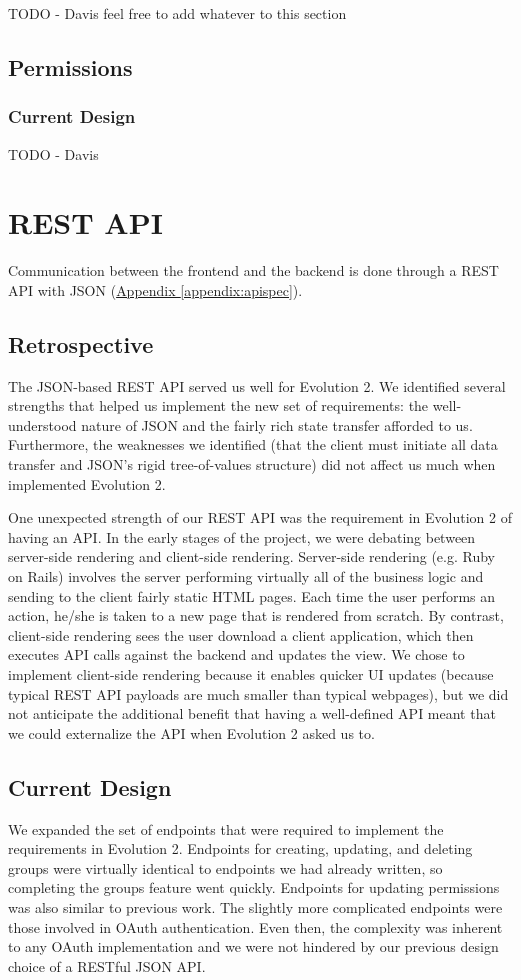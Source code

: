 \documentclass[12pt]{article}
\begin{document}
TODO - Davis feel free to add whatever to this section

\subsection{Permissions}
\subsubsection{Current Design}
TODO - Davis

\section{REST API}
\label{sec:REST}
Communication between the frontend and the backend is done through a REST API with JSON (\hyperref[appendix:apispec]{Appendix \ref{appendix:apispec}}).

\subsection{Retrospective}
The JSON-based REST API served us well for Evolution 2. We identified several strengths that helped us implement the new set of requirements: the well-understood nature of JSON and the fairly rich state transfer afforded to us. Furthermore, the weaknesses we identified (that the client must initiate all data transfer and JSON's rigid tree-of-values structure) did not affect us much when implemented Evolution 2.

One unexpected strength of our REST API was the requirement in Evolution 2 of having an API. In the early stages of the project, we were debating between server-side rendering and client-side rendering. Server-side rendering (e.g. Ruby on Rails) involves the server performing virtually all of the business logic and sending to the client fairly static HTML pages. Each time the user performs an action, he/she is taken to a new page that is rendered from scratch. By contrast, client-side rendering sees the user download a client application, which then executes API calls against the backend and updates the view. We chose to implement client-side rendering because it enables quicker UI updates (because typical REST API payloads are much smaller than typical webpages), but we did not anticipate the additional benefit that having a well-defined API meant that we could externalize the API when Evolution 2 asked us to.

\subsection{Current Design}
We expanded the set of endpoints that were required to implement the requirements in Evolution 2. Endpoints for creating, updating, and deleting groups were virtually identical to endpoints we had already written, so completing the groups feature went quickly. Endpoints for updating permissions was also similar to previous work. The slightly more complicated endpoints were those involved in OAuth authentication. Even then, the complexity was inherent to any OAuth implementation and we were not hindered by our previous design choice of a RESTful JSON API.
\end{document}
